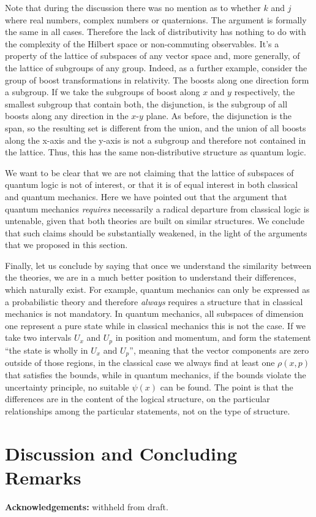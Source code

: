 \documentclass[11pt, executivepaper]{article}
\begin{document}
Note that during the discussion there was no mention as to whether $k$ and $j$ where real numbers, complex numbers or quaternions. The argument is formally the same in all cases. Therefore the lack of distributivity has nothing to do with the complexity of the Hilbert space or non-commuting observables. It's a property of the lattice of subspaces of any vector space and, more generally, of the lattice of subgroups of any group. Indeed, as a further example, consider the group of boost transformations in relativity. The boosts along one direction form a subgroup. If we take the subgroups of boost along $x$ and $y$ respectively, the smallest subgroup that contain both, the disjunction, is the subgroup of all boosts along any direction in the $x$-$y$ plane. As before, the disjunction is the span, so the resulting set is different from the union, and the union of all boosts along the x-axis and the y-axis is not a subgroup and therefore not contained in the lattice. Thus, this has the same non-distributive structure as quantum logic.

We want to be clear that we are not claiming that the lattice of subspaces of quantum logic is not of interest, or that it is of equal interest in both classical and quantum mechanics. Here we have pointed out that the argument that quantum mechanics \emph{requires} necessarily a radical departure from classical logic is untenable, given that both theories are built on similar structures. We conclude that such claims should be substantially weakened, in the light of the arguments that we proposed in this section. 

Finally, let us conclude by saying that once we understand the similarity between the theories, we are in a much better position to understand their differences, which naturally exist. For example, quantum mechanics can only be expressed as a probabilistic theory and therefore \emph{always} requires a structure that in classical mechanics is not mandatory. In quantum mechanics, all subspaces of dimension one represent a pure state while in classical mechanics this is not the case. If we take two intervals $U_x$ and $U_p$ in position and momentum, and form the statement ``the state is wholly in $U_x$ and $U_p$'', meaning that the vector components are zero outside of those regions, in the classical case we always find at least one $\rho(x,p)$ that satisfies the bounds, while in quantum mechanics, if the bounds violate the uncertainty principle, no suitable $\psi(x)$ can be found. The point is that the differences are in the content of the logical structure, on the particular relationships among the particular statements, not on the type of structure.

\section{Discussion and Concluding Remarks}
\label{conc}
\vspace{5mm}

\textbf{Acknowledgements:} withheld from draft.
\clearpage



\end{document}
